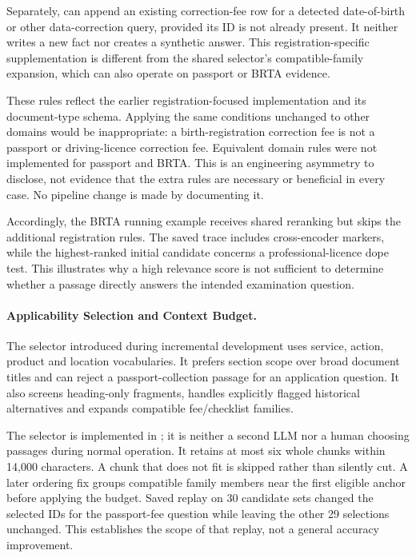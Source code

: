 Separately,  can append an existing correction-fee row for a detected date-of-birth or other data-correction query, provided its ID is not already present. It neither writes a new fact nor creates a synthetic answer. This registration-specific supplementation is different from the shared selector's compatible-family expansion, which can also operate on passport or BRTA evidence.

These rules reflect the earlier registration-focused implementation and its document-type schema. Applying the same conditions unchanged to other domains would be inappropriate: a birth-registration correction fee is not a passport or driving-licence correction fee. Equivalent domain rules were not implemented for passport and BRTA. This is an engineering asymmetry to disclose, not evidence that the extra rules are necessary or beneficial in every case. No pipeline change is made by documenting it.

Accordingly, the BRTA running example receives shared reranking but skips the additional registration rules. The saved trace includes cross-encoder markers, while the highest-ranked initial candidate concerns a professional-licence dope test. This illustrates why a high relevance score is not sufficient to determine whether a passage directly answers the intended examination question.

\paragraph{Applicability Selection and Context Budget.}
The selector introduced during incremental development uses service, action, product and location vocabularies. It prefers section scope over broad document titles and can reject a passport-collection passage for an application question. It also screens heading-only fragments, handles explicitly flagged historical alternatives and expands compatible fee/checklist families.

The selector is implemented in ; it is neither a second LLM nor a human choosing passages during normal operation. It retains at most six whole chunks within 14,000 characters. A chunk that does not fit is skipped rather than silently cut. A later ordering fix groups compatible family members near the first eligible anchor before applying the budget. Saved replay on 30 candidate sets changed the selected IDs for the passport-fee question while leaving the other 29 selections unchanged. This establishes the scope of that replay, not a general accuracy improvement.


